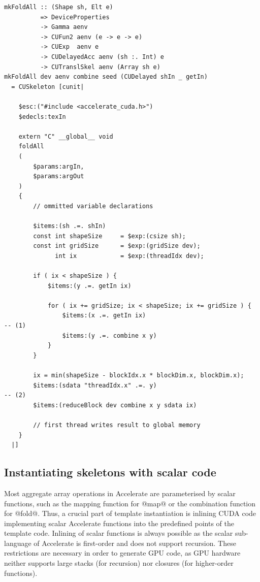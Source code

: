 \begin{lstlisting}[style=haskell
    ,float
    ,label=lst:mkfold
    ,caption={Accelerate CUDA skeleton for the \code{foldAll} operation}]
mkFoldAll :: (Shape sh, Elt e)
          => DeviceProperties
          -> Gamma aenv
          -> CUFun2 aenv (e -> e -> e)
          -> CUExp  aenv e
          -> CUDelayedAcc aenv (sh :. Int) e
          -> CUTranslSkel aenv (Array sh e)
mkFoldAll dev aenv combine seed (CUDelayed shIn _ getIn)
  = CUSkeleton [cunit|

    $esc:("#include <accelerate_cuda.h>")
    $edecls:texIn

    extern "C" __global__ void
    foldAll
    (
        $params:argIn,
        $params:argOut
    )
    {
        // ommitted variable declarations

        $items:(sh .=. shIn)
        const int shapeSize     = $exp:(csize sh);
        const int gridSize      = $exp:(gridSize dev);
              int ix            = $exp:(threadIdx dev);

        if ( ix < shapeSize ) {
            $items:(y .=. getIn ix)

            for ( ix += gridSize; ix < shapeSize; ix += gridSize ) {
                $items:(x .=. getIn ix)                                                -- (1)
                $items:(y .=. combine x y)
            }
        }

        ix = min(shapeSize - blockIdx.x * blockDim.x, blockDim.x);
        $items:(sdata "threadIdx.x" .=. y)                                             -- (2)
        $items:(reduceBlock dev combine x y sdata ix)

        // first thread writes result to global memory
    }
  |]
\end{lstlisting}


\subsection{Instantiating skeletons with scalar code}
\label{sec:instantiating_skeletons_with_scalar_code}

Most aggregate array operations in Accelerate are parameterised by scalar
functions, such as the mapping function for @map@ or the combination
function for @fold@. Thus, a crucial part of template instantiation is
inlining CUDA code implementing scalar Accelerate functions into the predefined
points of the template code. Inlining of scalar functions is always possible as
the scalar sub-language of Accelerate is first-order and does not support
recursion. These restrictions are necessary in order to generate GPU code, as
GPU hardware neither supports large stacks (for recursion) nor closures (for
higher-order functions).

